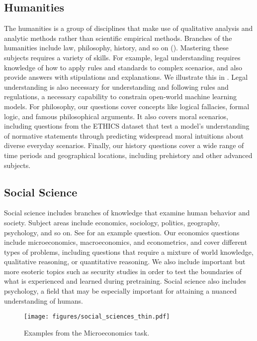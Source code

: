 \documentclass{article} \usepackage{iclr2021_conference, times}
\begin{document}
\subsection{Humanities}
The humanities is a group of disciplines that make use of qualitative analysis and analytic methods rather than scientific empirical methods. Branches of the humanities include law, philosophy, history, and so on (). Mastering these subjects requires a variety of skills. For example, legal understanding requires knowledge of how to apply rules and standards to complex scenarios, and also provide answers with stipulations and explanations. We illustrate this in .
Legal understanding is also necessary for understanding and following rules and regulations, a necessary capability to constrain open-world machine learning models.
For philosophy, our questions cover concepts like logical fallacies, formal logic, and famous philosophical arguments. It also covers moral scenarios, including questions from the ETHICS dataset \citep{hendrycks2020ethicsdataset} that test a model's understanding of normative statements through predicting widespread moral intuitions about diverse everyday scenarios. Finally, our history questions cover a wide range of time periods and geographical locations, including prehistory and other advanced subjects.







\subsection{Social Science}
Social science includes branches of knowledge that examine human behavior and society. Subject areas include economics, sociology, politics, geography, psychology, and so on. See  for an example question. Our economics questions include microeconomics, macroeconomics, and econometrics, and cover different types of problems, including questions that require a mixture of world knowledge, qualitative reasoning, or quantitative reasoning.
We also include important but more esoteric topics such as security studies in order to test the boundaries of what is experienced and learned during pretraining.
Social science also includes psychology, a field that may be especially important for attaining a nuanced understanding of humans.



\begin{figure}[t]
    \centering
    \vspace{-20pt}
    \texttt{[image: figures/social\_sciences\_thin.pdf]}
    \caption{Examples from the Microeconomics task. }
    \label{fig:socsci}
\end{figure}
\end{document}
